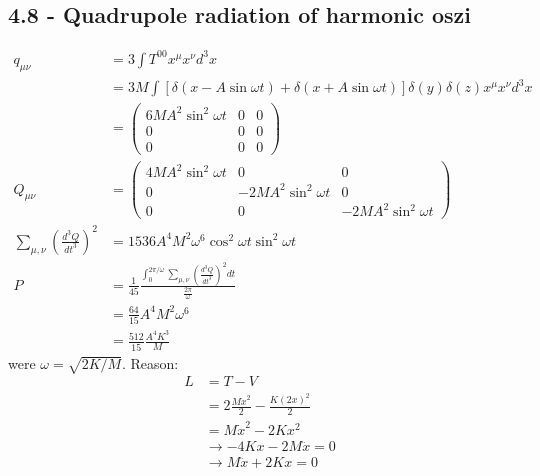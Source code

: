 \documentclass[10pt,a4paper]{book}
\theoremstyle{definition}
\begin{document}
\subsection{4.8 - Quadrupole radiation of harmonic oszi}
\begin{align}
q_{\mu\nu}
&=3\int T^{00}x^\mu x^\nu d^3x\\
&=3M\int [\delta(x-A\sin\omega t)+\delta(x+A\sin\omega t)]\delta(y)\delta(z)x^\mu x^\nu d^3x\\
&=\left(\begin{array}{ccc}
6MA^2\sin^2\omega t & 0 & 0\\
0 & 0 & 0\\
0 & 0 & 0
\end{array}
\right)\\
Q_{\mu\nu}
&=\left(\begin{array}{ccc}
4MA^2\sin^2\omega t & 0 & 0\\
0 & -2MA^2\sin^2\omega t & 0\\
0 & 0 & -2MA^2\sin^2\omega t
\end{array}
\right)\\
\sum_{\mu,\nu}\left(\frac{d^3Q}{dt^3}\right)^2&=1536 A^4M^2\omega^6\cos^2\omega t\sin^2\omega t\\
P&=\frac{1}{45}\frac{\int_0^{2\pi/\omega}\sum_{\mu,\nu}\left(\frac{d^3Q}{dt^3}\right)^2dt}{\frac{2\pi}{\omega}}\\
&=\frac{64}{15}A^4M^2\omega^6\\
&=\frac{512}{15}\frac{A^4K^3}{M}
\end{align}
were $\omega=\sqrt{2K/M}$. Reason:
\begin{align}
L&=T-V\\
&=2\frac{M\dot{x}^2}{2}-\frac{K(2x)^2}{2}\\
&=M\dot{x}^2-2Kx^2\\
&\rightarrow -4Kx-2M\ddot{x}=0\\
&\rightarrow M\ddot{x}+2Kx=0
\end{align}
\end{document}

